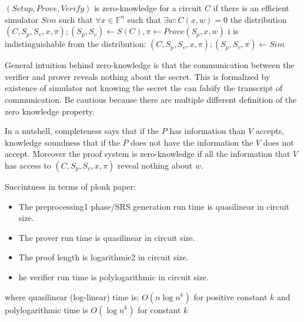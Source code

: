 \begin{definition}
    $(Setup, Prove, Verify)$ is zero-knowledge for a circuit $C$ if there is an efficient simulator $Sim$ such that $\forall x \in \mathbb{F}^n$ such that $\exists w: C(x, w) = 0$ the distribution 
    $(C, S_p, S_v, x, \pi); (S_p, S_v) \leftarrow S(C), \pi \leftarrow Prove(S_p, x, w )$ i
    is indistinguishable from the distribution: 
    $(C, S_p, S_v, x, \pi) ; (S_p, S_v, \pi) \leftarrow Sim$
\end{definition}

General intuition behind zero-knowledge is that the communication between the verifier and prover reveals nothing about the secret. This is formalized by existence of simulator not knowing the secret the can falsify the transcript of communication. Be cautious because there are multiple different definition of the zero knowledge property. %

In a nutshell, completeness says that if the $P$ has information than $V$ accepts, knowledge soundness that if the $P$ does not have the information the $V$ does not accept. Moreover the proof system is zero-knowledge if all the information that $V$ has access to $(C, S_p, S_v, x, \pi)$ reveal nothing about $w$.

Succintness in terms of plonk paper:
\begin{itemize}
    \item The preprocessing1 phase/SRS generation run time is quasilinear in circuit size.
    \item The prover run time is quasilinear in circuit size.
    \item The proof length is logarithmic2 in circuit size.
    \item he verifier run time is polylogarithmic in circuit size.
\end{itemize}

where quasilinear (log-linear) time is: $O(n \log{n}^k)$ for positive constant $k$ and polylogarithmic time is $O(\log{n}^k)$ for constant $k$


